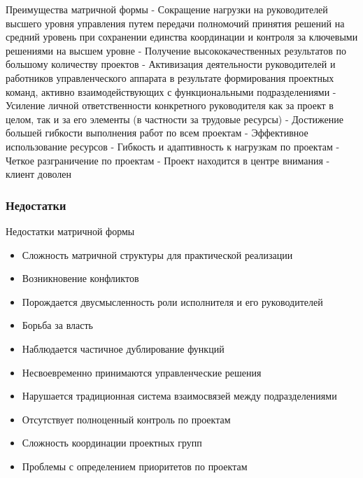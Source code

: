 \documentclass{../industrial-development}
\begin{document}
\lecturenotes
Преимущества матричной формы
- Сокращение нагрузки на руководителей высшего уровня управления путем передачи полномочий принятия решений на средний уровень при сохранении единства координации и контроля за ключевыми решениями на высшем уровне
- Получение высококачественных результатов по большому количеству проектов
- Активизация деятельности руководителей и работников управленческого аппарата в результате формирования проектных команд, активно взаимодействующих с функциональными подразделениями
- Усиление личной ответственности конкретного руководителя как за проект в целом, так и за его элементы (в частности за трудовые ресурсы)
- Достижение большей гибкости выполнения работ по всем проектам
- Эффективное использование ресурсов
- Гибкость и адаптивность к нагрузкам по проектам
- Четкое разграничение по проектам
- Проект находится в центре внимания - клиент доволен

\begin{frame} \frametitle{Недостатки}
  \begin{block}{Недостатки матричной формы}
  \end{block}
  
  \begin{itemize}
  \item Сложность матричной структуры для практической реализации
  \item Возникновение конфликтов
  \item Порождается двусмысленность роли исполнителя и его руководителей
  \item Борьба за власть
  \item Наблюдается частичное дублирование функций
  \item Несвоевременно принимаются управленческие решения
  \item Нарушается традиционная система взаимосвязей между подразделениями
  \item Отсутствует полноценный контроль по проектам
  \item Сложность координации проектных групп
  \item Проблемы  с определением приоритетов по проектам
  \end{itemize}
\end{frame}
\end{document}
